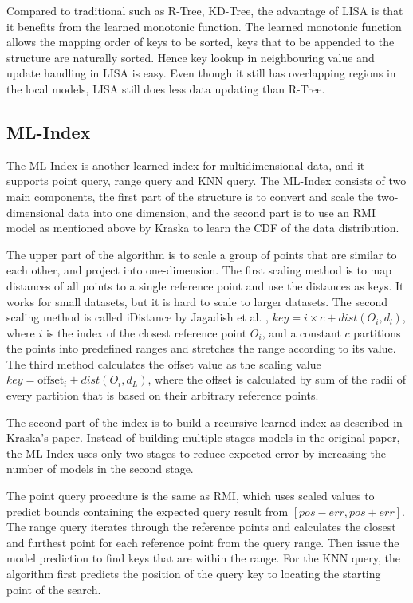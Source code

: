 Compared to traditional such as R-Tree, KD-Tree, the advantage of LISA is that it benefits from the learned monotonic function. The learned monotonic function allows the mapping order of keys to be sorted, keys that to be appended to the structure are naturally sorted. Hence key lookup in neighbouring value and update handling in LISA is easy. Even though it still has overlapping regions in the local models, LISA still does less data updating than R-Tree. 

\subsection{ML-Index}
The ML-Index \cite{Davitkova:2020dx} is another learned index for multidimensional data, and it supports point query, range query and KNN query. The ML-Index consists of two main components, the first part of the structure is to convert and scale the two-dimensional data into one dimension, and the second part is to use an RMI model as mentioned above by Kraska to learn the CDF of the data distribution. 

The upper part of the algorithm is to scale a group of points that are similar to each other, and project into one-dimension. The first scaling method is to map distances of all points to a single reference point and use the distances as keys. It works for small datasets, but it is hard to scale to larger datasets. The second scaling method is called iDistance by Jagadish et al. \cite{jagadish2005idistance}, $key = i \times c + dist(O_i, d_l)$, where $i$ is the index of the closest reference point $O_i$, and a constant $c$ partitions the points into predefined ranges and stretches the range according to its value. The third method calculates the offset value as the scaling value $key = \text{offset}_i + dist(O_i, d_L)$, where the offset is calculated by sum of the radii of every partition that is based on their arbitrary reference points.  

The second part of the index is to build a recursive learned index as described in Kraska's paper. Instead of building multiple stages models in the original paper, the ML-Index uses only two stages to reduce expected error by increasing the number of models in the second stage. 

The point query procedure is the same as RMI, which uses scaled values to predict bounds containing the expected query result from $[pos - err, pos + err]$. The range query iterates through the reference points and calculates the closest and furthest point for each reference point from the query range. Then issue the model prediction to find keys that are within the range. For the KNN query, the algorithm first predicts the position of the query key to locating the starting point of the search. 


